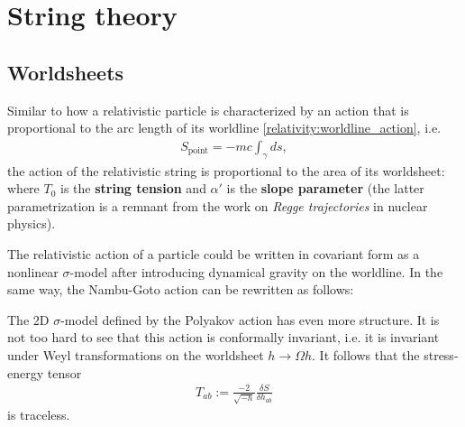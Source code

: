 \section{String theory}
\subsection{Worldsheets}

    Similar to how a relativistic particle is characterized by an action that is proportional to the arc length of its worldline \eqref{relativity:worldline_action}, i.e.
    \begin{gather}
        S_\mathrm{point}=-mc\int_\gamma ds,
    \end{gather}
    the action of the relativistic string is proportional to the area of its worldsheet:
    where $T_0$ is the \textbf{string tension} and $\alpha'$ is the \textbf{slope parameter} (the latter parametrization is a remnant from the work on \textit{Regge trajectories} in nuclear physics).

    The relativistic action of a particle could be written in covariant form as a nonlinear $\sigma$-model after introducing dynamical gravity on the worldline. In the same way, the Nambu-Goto action can be rewritten as follows:

    \begin{property}
        The 2D $\sigma$-model defined by the Polyakov action has even more structure. It is not too hard to see that this action is conformally invariant, i.e. it is invariant under Weyl transformations on the worldsheet $h\longrightarrow\Omega h$. It follows that the stress-energy tensor
        \begin{gather}
            T_{ab} := \frac{-2}{\sqrt{-h}}\frac{\delta S}{\delta h_{ab}}
        \end{gather}
        is traceless.
    \end{property}

